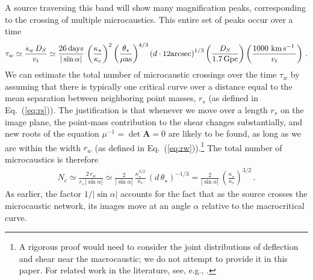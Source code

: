 \documentclass{aastex6}
\newcommand{\bt}[1]{\mathbf #1}
\newcommand{\refeq}[1]{Eq.~(\ref{eq:#1})}
\def\kms{\, {\rm km}\, {\rm s}^{-1}\, }
\newcommand{\ba}{\begin{eqnarray}}
\newcommand{\ea}{\end{eqnarray}}
\begin{document}
A source traversing this band will show many magnification peaks, corresponding to the crossing of multiple microcaustics. This entire set of peaks occur over a time
\ba
\label{eq:tauw}
\tau_{w} \simeq \frac{s_w\,D_S}{v_t} \simeq
 \frac{26 \,{\rm days}}{|\sin\alpha|}\,
 \left( \frac{\kappa_\star}{\kappa_c} \right)^2
 \left( \frac{\theta_\star}{\mu{\rm as}} \right)^{4/3}
 \left( d\cdot 12 {\rm arcsec} \right)^{1/3}
 \left( \frac{D_S}{1.7\,{\rm Gpc}} \right)
 \left( \frac{1000\,\kms}{v_t} \right) \, .
\ea
We can estimate the total number of microcaustic crossings over the time $\tau_w$ by assuming that there is typically one critical curve over a distance equal to the mean separation between neighboring point masses, $r_s$ (as defined in \refeq{rs}). The justification is that whenever we move over a length $r_s$ on the image plane, the point-mass contribution to the shear changes substantially, and new roots of the equation $\mu^{-1} = \det \bt{A} = 0$ are likely to be found, as long as we are within the width $r_w$ (as defined in \refeq{rw}).\footnote{A rigorous proof would need to consider the joint distributions of deflection and shear near the macrocaustic; we do not attempt to provide it in this paper. For related work in the literature, see, e.g., \cite{1994A&A...288...19S}.} The total number of microcaustics is therefore
\ba
\label{eq:Nc}
N_c \simeq \frac{2\,r_w}{r_s\,|\sin\alpha|} \simeq
 \frac{2}{|\sin\alpha|}\, \frac{\kappa^{3/2}_\star}{\kappa_c}\,
 \left( d\, \theta_\star \right)^{-1/3} =
 \frac{2}{|\sin\alpha|}\,
 \left( \frac{\kappa_\star}{\kappa_c} \right)^{3/2} \, .
\ea
As earlier, the factor $1/|\sin\alpha |$ accounts for the fact that as the source crosses the microcaustic network, its images move at an angle $\alpha$ relative to the macrocritical curve.
\end{document}
